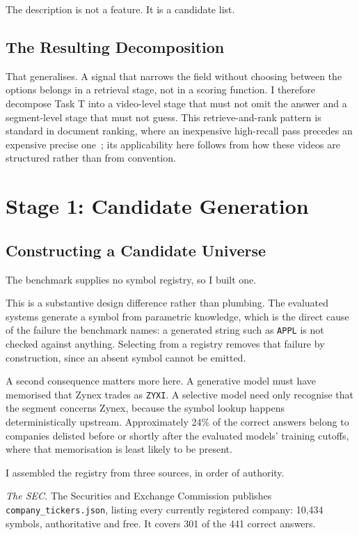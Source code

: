 \documentclass[conference]{IEEEtran}
\begin{document}
The description is not a feature. It is a candidate list.

\subsection{The Resulting Decomposition}

That generalises. A signal that narrows the field without choosing between the
options belongs in a retrieval stage, not in a scoring function. I therefore decompose Task T into a video-level stage that
must not omit the answer and a segment-level stage that must not guess. This
retrieve-and-rank pattern is standard in document ranking, where an inexpensive
high-recall pass precedes an expensive precise one~\cite{luan}; its
applicability here follows from how these videos are structured rather than
from convention.

\section{Stage 1: Candidate Generation}

\subsection{Constructing a Candidate Universe}
\label{sec:universe}

The benchmark supplies no symbol registry, so I built one.

This is a substantive design difference rather than plumbing. The evaluated
systems generate a symbol from parametric knowledge, which is the direct cause
of the failure the benchmark names: a generated string such as \texttt{APPL} is
not checked against anything. Selecting from a registry removes that failure by
construction, since an absent symbol cannot be emitted.

A second consequence matters more here. A generative model must have memorised
that Zynex trades as \texttt{ZYXI}. A selective model need only recognise that
the segment concerns Zynex, because the symbol lookup happens deterministically
upstream. Approximately 24\% of the correct answers belong to companies delisted
before or shortly after the evaluated models' training cutoffs, where that
memorisation is least likely to be present.

I assembled the registry from three sources, in order of authority.

\emph{The SEC.} The Securities and Exchange Commission publishes
\texttt{company\_tickers.json}, listing every currently registered company:
10{,}434 symbols, authoritative and free. It covers 301 of the 441
correct answers.
\end{document}
